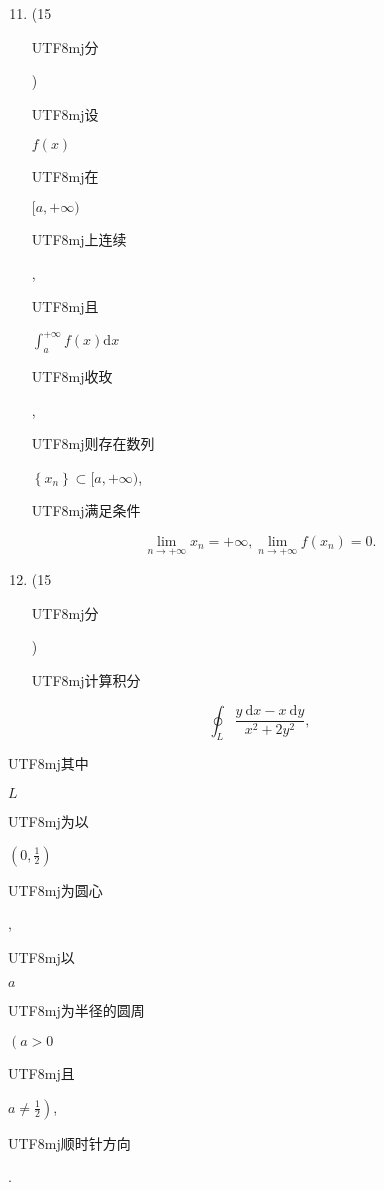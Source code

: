 \documentclass[10pt]{article}
\begin{document}
\begin{enumerate}
  \setcounter{enumi}{10}
  \item (15 \begin{CJK}{UTF8}{mj}分\end{CJK}) \begin{CJK}{UTF8}{mj}设\end{CJK} $f(x)$ \begin{CJK}{UTF8}{mj}在\end{CJK} $[a,+\infty)$ \begin{CJK}{UTF8}{mj}上连续\end{CJK}, \begin{CJK}{UTF8}{mj}且\end{CJK} $\int_{a}^{+\infty} f(x) \mathrm{d} x$ \begin{CJK}{UTF8}{mj}收玫\end{CJK}, \begin{CJK}{UTF8}{mj}则存在数列\end{CJK} $\left\{x_{n}\right\} \subset[a,+\infty)$, \begin{CJK}{UTF8}{mj}满足条件\end{CJK}
\end{enumerate}
$$
\lim _{n \rightarrow+\infty} x_{n}=+\infty, \lim _{n \rightarrow+\infty} f\left(x_{n}\right)=0 .
$$

\begin{enumerate}
  \setcounter{enumi}{11}
  \item (15 \begin{CJK}{UTF8}{mj}分\end{CJK}) \begin{CJK}{UTF8}{mj}计算积分\end{CJK}
\end{enumerate}
$$
\oint_{L} \frac{y \mathrm{~d} x-x \mathrm{~d} y}{x^{2}+2 y^{2}},
$$
\begin{CJK}{UTF8}{mj}其中\end{CJK} $L$ \begin{CJK}{UTF8}{mj}为以\end{CJK} $\left(0, \frac{1}{2}\right)$ \begin{CJK}{UTF8}{mj}为圆心\end{CJK}, \begin{CJK}{UTF8}{mj}以\end{CJK} $a$ \begin{CJK}{UTF8}{mj}为半径的圆周\end{CJK} $\left(a>0\right.$ \begin{CJK}{UTF8}{mj}且\end{CJK} $\left.a \neq \frac{1}{2}\right)$, \begin{CJK}{UTF8}{mj}顺时针方向\end{CJK}.
\end{document}
